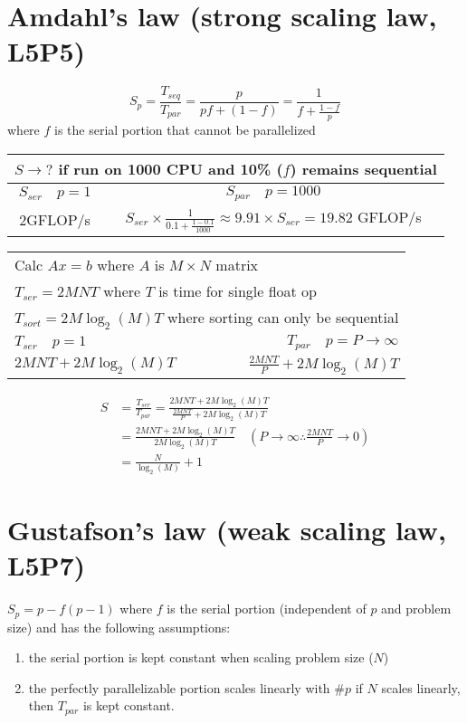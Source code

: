 \section*{Amdahl's law (strong scaling law, \textbf{L5P5})}
\begin{equation}
  \label{eq:amdahl}
  S_p = \frac{T_{seq}}{T_{par}} = \frac{p}{pf + (1-f)} = \frac{1}{f + \frac{1-f}{p}}
\end{equation}
where $f$ is the serial portion that cannot be parallelized
\begin{tabular}{c|c}
  \hline
  \multicolumn{2}{l}{$S \rightarrow ? $ if run on 1000 CPU and 10\% ($f$) remains sequential} \\
  \hline
  $S_{ser} \quad p = 1$ & $S_{par} \quad p = 1000$  \\
  \hline
  2GFLOP/s  & $S_{ser} \times \frac{1}{0.1 + \frac{1-0.1}{1000}} \approx 9.91 \times S_{ser} = 19.82$ GFLOP/s \\
  \hline
\end{tabular}
\begin{tabular}{l|r}
  \hline
  \multicolumn{2}{l}{Calc $Ax=b$ where $A$ is $M \times N$ matrix} \\
  \multicolumn{2}{l}{$T_{ser} = 2MNT$ where $T$ is time for single float op} \\
  \multicolumn{2}{l}{$T_{sort} = 2M\log_2(M)T$ where sorting can only be sequential} \\
  \hline
  $T_{ser} \quad p = 1$ & $T_{par} \quad p = P \rightarrow \infty$ \\
  \hline
  $2MNT + 2M\log_2(M)T$ & $\frac{2MNT}{P} + 2M\log_2(M)T$ \\
  \hline
\end{tabular}
\begin{align*}
  S & = \frac{T_{ser}}{T_{par}} = \frac{2MNT + 2M\log_2(M)T}{\frac{2MNT}{P} + 2M\log_2(M)T} \\
    & = \frac{2MNT + 2M\log_2(M)T}{2M\log_2(M)T} \quad (P \rightarrow \infty \therefore \frac{2MNT}{P} \rightarrow 0) \\
    & = \frac{N}{\log_2(M)} + 1
\end{align*}
\section*{Gustafson's law (weak scaling law, \textbf{L5P7})}
\(S_p = p - f(p-1)\) where $f$ is the serial portion (independent of $p$ and problem size) and has the following assumptions:
\begin{enumerate}
\item the serial portion is kept constant when scaling problem size ($N$)
\item the perfectly parallelizable portion scales linearly with $\#p$ if $N$ scales linearly, then $T_{par}$ is kept constant.
\end{enumerate}

